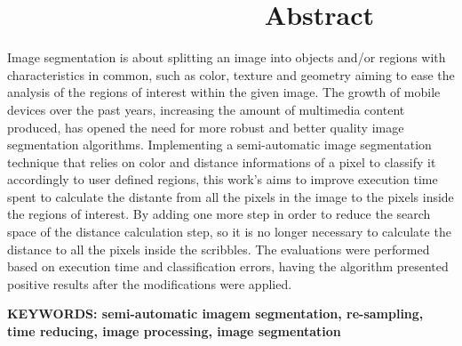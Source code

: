 %
% 

\chapter*{\ \ \ \ \ \ \ \ \ \ \ \ \ \ \ \ \ \ Abstract}\thispagestyle{empty}

%

Image segmentation is about splitting an image into objects and/or regions with characteristics in common, such as color, texture and geometry aiming to ease the analysis of the regions of interest within the given image. The growth of mobile devices over the past years, increasing the amount of multimedia content produced, has opened the need for more robust and better quality image segmentation algorithms. Implementing a semi-automatic image segmentation technique that relies on color and distance informations of a pixel to classify it accordingly to user defined regions, this work's aims to improve execution time spent to calculate the distante from all the pixels in the image to the pixels inside the regions of interest. By adding one more step in order to reduce the search space of the distance calculation step, so it is no longer necessary to calculate the distance to all the pixels inside the scribbles. The evaluations were performed based on execution time and classification errors, having the algorithm presented positive results after the modifications were applied.

\textbf{KEYWORDS: semi-automatic imagem segmentation, re-sampling, time reducing, image processing, image segmentation}

%
%